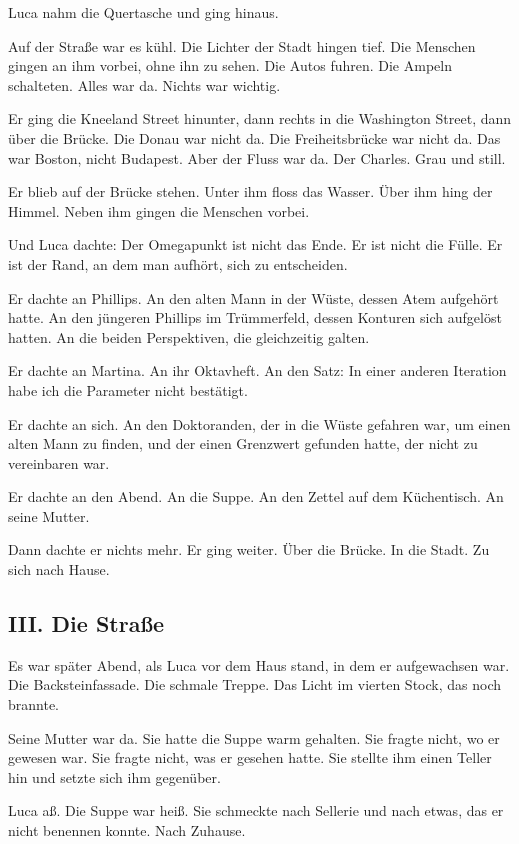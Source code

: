 \documentclass[
  ngerman,
]{article}
\begin{document}
Luca nahm die Quertasche und ging hinaus.

Auf der Straße war es kühl. Die Lichter der Stadt hingen tief. Die
Menschen gingen an ihm vorbei, ohne ihn zu sehen. Die Autos fuhren. Die
Ampeln schalteten. Alles war da. Nichts war wichtig.

Er ging die Kneeland Street hinunter, dann rechts in die Washington
Street, dann über die Brücke. Die Donau war nicht da. Die
Freiheitsbrücke war nicht da. Das war Boston, nicht Budapest. Aber der
Fluss war da. Der Charles. Grau und still.

Er blieb auf der Brücke stehen. Unter ihm floss das Wasser. Über ihm
hing der Himmel. Neben ihm gingen die Menschen vorbei.

Und Luca dachte: Der Omegapunkt ist nicht das Ende. Er ist nicht die
Fülle. Er ist der Rand, an dem man aufhört, sich zu entscheiden.

Er dachte an Phillips. An den alten Mann in der Wüste, dessen Atem
aufgehört hatte. An den jüngeren Phillips im Trümmerfeld, dessen
Konturen sich aufgelöst hatten. An die beiden Perspektiven, die
gleichzeitig galten.

Er dachte an Martina. An ihr Oktavheft. An den Satz: In einer anderen
Iteration habe ich die Parameter nicht bestätigt.

Er dachte an sich. An den Doktoranden, der in die Wüste gefahren war, um
einen alten Mann zu finden, und der einen Grenzwert gefunden hatte, der
nicht zu vereinbaren war.

Er dachte an den Abend. An die Suppe. An den Zettel auf dem Küchentisch.
An seine Mutter.

Dann dachte er nichts mehr. Er ging weiter. Über die Brücke. In die
Stadt. Zu sich nach Hause.

\subsection{III. Die Straße}\label{iii.-die-strauxdfe}

Es war später Abend, als Luca vor dem Haus stand, in dem er aufgewachsen
war. Die Backsteinfassade. Die schmale Treppe. Das Licht im vierten
Stock, das noch brannte.

Seine Mutter war da. Sie hatte die Suppe warm gehalten. Sie fragte
nicht, wo er gewesen war. Sie fragte nicht, was er gesehen hatte. Sie
stellte ihm einen Teller hin und setzte sich ihm gegenüber.

Luca aß. Die Suppe war heiß. Sie schmeckte nach Sellerie und nach etwas,
das er nicht benennen konnte. Nach Zuhause.
\end{document}
